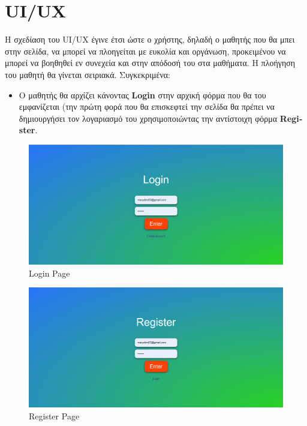 \section{\textlatin{UI/UX}}
Η σχεδίαση του \textlatin{UI/UX} έγινε έτσι ώστε ο χρήστης, δηλαδή ο μαθητής που θα μπει στην σελίδα, να μπορεί να πλοηγείται με ευκολία και οργάνωση, προκειμένου να μπορεί να βοηθηθεί εν συνεχεία και στην απόδοσή του στα μαθήματα. Η πλοήγηση του μαθητή θα γίνεται σειριακά. Συγκεκριμένα:

\begin{itemize}
    \item Ο μαθητής θα αρχίζει κάνοντας \textbf{\textlatin{Login}} στην αρχική φόρμα που θα του εμφανίζεται (την πρώτη φορά που θα επισκεφτεί την σελίδα θα πρέπει να δημιουργήσει τον λογαριασμό του χρησιμοποιώντας την αντίστοιχη φόρμα \textbf{\textlatin{Register}}.
\end{itemize}
\begin{figure}[H]
        \centering
        \includegraphics[width=1\linewidth]{img/Login.png}
        \caption{\textlatin{Login Page}}
\end{figure}
\begin{figure}[H]
    \centering
    \includegraphics[width=1\linewidth]{img/Register.png}
    \caption{\textlatin{Register Page}}
\end{figure}

